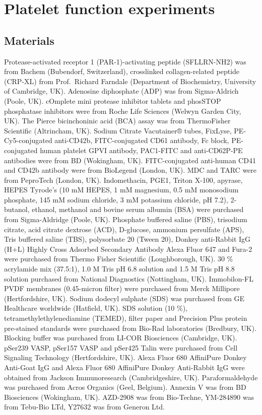 \documentclass[11pt,twoside]{bristolthesis}
\begin{document}
\hypertarget{platelet-function-experiments}{%
\section{Platelet function experiments}\label{platelet-function-experiments}}

\hypertarget{materials}{%
\subsection{Materials}\label{materials}}

Protease-activated receptor 1 (PAR-1)-activating peptide (SFLLRN-NH2) was from Bachem (Bubendorf, Switzerland), crosslinked collagen-related peptide (CRP-XL) from Prof.~Richard Farndale (Department of Biochemistry, University of Cambridge, UK). Adenosine diphosphate (ADP) was from Sigma-Aldrich (Poole, UK). cOmplete mini protease inhibitor tablets and phosSTOP phosphatase inhibitors were from Roche Life Sciences (Welwyn Garden City, UK). The Pierce bicinchoninic acid (BCA) assay was from ThermoFisher Scientific (Altrincham, UK). Sodium Citrate Vacutainer® tubes, FixLyse, PE-Cy5-conjugated anti-CD42b, FITC-conjugated CD61 antibody, Fc block, PE-conjugated human platelet GPVI antibody, PAC1-FITC and anti-CD62P-PE antibodies were from BD (Wokingham, UK). FITC-conjugated anti-human CD41 and CD42b antibody were from BioLegend (London, UK). MDC and TARC were from PeproTech (London, UK). Indomethacin, PGE1, Triton X-100, apyrase, HEPES Tyrode's (10 mM HEPES, 1 mM magnesium, 0.5 mM monosodium phosphate, 145 mM sodium chloride, 3 mM potassium chloride, pH 7.2), 2-butanol, ethanol, methanol and bovine serum albumin (BSA) were purchased from Sigma-Aldridge (Poole, UK). Phosphate buffered saline (PBS), trisodium citrate, acid citrate dextrose (ACD), D-glucose, ammonium persulfate (APS), Tris buffered saline (TBS), polysorbate 20 (Tween 20), Donkey anti-Rabbit IgG (H+L) Highly Cross Adsorbed Secondary Antibody Alexa Fluor 647 and Fura-2 were purchased from Thermo Fisher Scientific (Loughborough, UK). 30 \% acrylamide mix (37.5:1), 1.0 M Tris pH 6.8 solution and 1.5 M Tris pH 8.8 solution purchased from National Diagnostics (Nottingham, UK). Immobilon-FL PVDF membranes (0.45-micron filter) were purchased from Merck Millipore (Hertfordshire, UK). Sodium dodecyl sulphate (SDS) was purchased from GE Healthcare worldwide (Hatfield, UK). SDS solution (10 \%), tetramethylethylenediamine (TEMED), filter paper and Precision Plus protein pre-stained standards were purchased from Bio-Rad laboratories (Bredbury, UK). Blocking buffer was purchased from LI-COR Biosciences (Cambridge, UK). pSer239 VASP, pSer157 VASP and pSer425 Talin were purchased from Cell Signaling Technology (Hertfordshire, UK). Alexa Fluor 680 AffiniPure Donkey Anti-Goat IgG and Alexa Fluor 680 AffiniPure Donkey Anti-Rabbit IgG were obtained from Jackson Immunoresearch (Cambridgeshire, UK). Paraformaldehyde was purchased from Acros Organics (Geel, Belgium). Annexin V was from BD Biosciences (Wokingham, UK). AZD-2908 was from Bio-Techne, YM-284890 was from Tebu-Bio LTd, Y27632 was from Generon Ltd.
\end{document}

